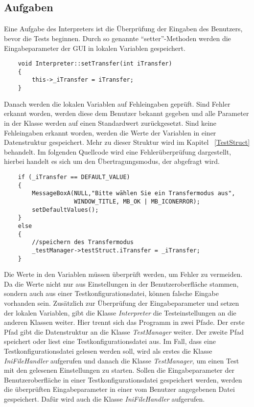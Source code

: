 \subsection{Aufgaben}
\paragraph{}
Eine Aufgabe des Interpreters ist die Überprüfung der Eingaben des Benutzers, bevor die Tests beginnen. Durch so genannte "`setter"'-Methoden werden die Eingabeparameter der GUI in lokalen Variablen gespeichert.\\


\begin{lstlisting}	 
	void Interpreter::setTransfer(int iTransfer)
	{
		this->_iTransfer = iTransfer;
	}
\end{lstlisting}

Danach werden die lokalen Variablen auf Fehleingaben geprüft. Sind Fehler erkannt worden, werden diese dem Benutzer bekannt gegeben und alle Parameter in der Klasse werden auf einen Standardwert zurückgesetzt. Sind keine Fehleingaben erkannt worden, werden die Werte der Variablen in einer Datenstruktur gespeichert. Mehr zu dieser Struktur wird im Kapitel ~\ref{TestStruct} behandelt. Im folgenden Quellcode wird eine Fehlerüberprüfung dargestellt, hierbei handelt es sich um den Übertragungsmodus, der abgefragt wird.

\begin{lstlisting}	 
	if (_iTransfer == DEFAULT_VALUE)
	{
		MessageBoxA(NULL,"Bitte wählen Sie ein Transfermodus aus",
                    WINDOW_TITLE, MB_OK | MB_ICONERROR);
		setDefaultValues();
	}
	else
	{
		//speichern des Transfermodus
		_testManager->testStruct.iTransfer = _iTransfer;
	}
\end{lstlisting}

Die Werte in den Variablen müssen überprüft werden, um Fehler zu vermeiden. Da die Werte nicht nur aus Einstellungen in der Benutzeroberfläche stammen, sondern auch aus einer Testkonfigurationsdatei, können falsche Eingabe vorhanden sein. Zusätzlich zur Überprüfung der Eingabeparameter und setzen der lokalen Variablen, gibt die Klasse \textit{Interpreter} die Testeinstellungen an die anderen Klassen weiter. Hier trennt sich das Programm in zwei Pfade. Der erste Pfad gibt die Datenstruktur an die Klasse \textit{TestManager} weiter. Der zweite Pfad speichert oder liest eine Testkonfigurationsdatei aus. Im Fall, dass eine Testkonfigurationsdatei gelesen werden soll, wird als erstes die Klasse \textit{IniFileHandler} aufgerufen und danach die Klasse \textit{TestManager}, um einen Test mit den gelesenen Einstellungen zu starten. Sollen die Eingabeparameter der Benutzeroberfläche in einer Testkonfigurationsdatei gespeichert werden, werden die überprüften Eingabeparameter in einer vom Benutzer angegebenen Datei gespeichert. Dafür wird auch die Klasse \textit{IniFileHandler} aufgerufen.\\

